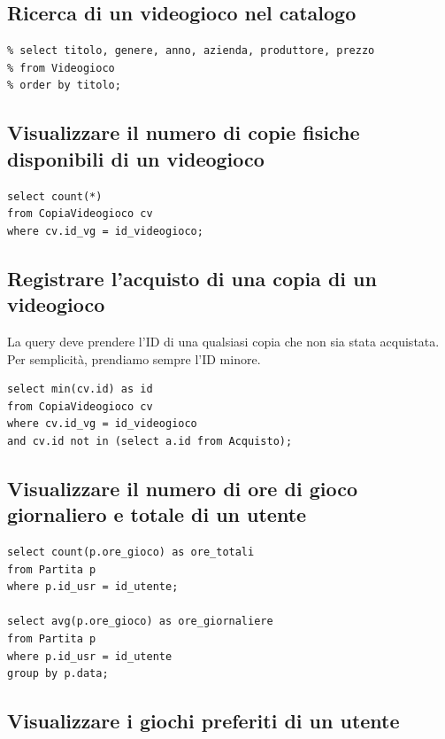 \documentclass[a4paper,12pt]{report}
\begin{document}
\subsection*{Ricerca di un videogioco nel catalogo}

\begin{lstlisting}
% select titolo, genere, anno, azienda, produttore, prezzo
% from Videogioco
% order by titolo;
\end{lstlisting}

\subsection*{Visualizzare il numero di copie fisiche disponibili di un videogioco}

\begin{lstlisting}
select count(*)
from CopiaVideogioco cv
where cv.id_vg = id_videogioco;
\end{lstlisting}

\subsection*{Registrare l'acquisto di una copia di un videogioco}

La query deve prendere l'ID di una qualsiasi copia che non sia stata acquistata. Per semplicità, prendiamo sempre l'ID minore.

\begin{lstlisting}
select min(cv.id) as id
from CopiaVideogioco cv
where cv.id_vg = id_videogioco
and cv.id not in (select a.id from Acquisto);
\end{lstlisting}

\subsection*{Visualizzare il numero di ore di gioco giornaliero e totale di un utente}

\begin{lstlisting}
select count(p.ore_gioco) as ore_totali
from Partita p
where p.id_usr = id_utente;

select avg(p.ore_gioco) as ore_giornaliere
from Partita p
where p.id_usr = id_utente
group by p.data;
\end{lstlisting}

\subsection*{Visualizzare i giochi preferiti di un utente}
\end{document}
